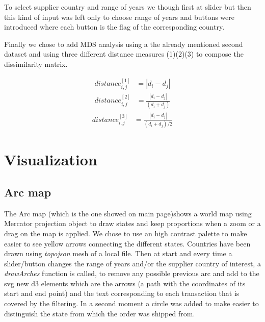 \documentclass{article}
\begin{document}
\begin{multicols}{2}
To select supplier country and range of years we though first at slider but then this kind of input was left only to choose range of years and buttons were introduced where each button is the flag of the corresponding country. 

Finally we chose to add MDS analysis using a the already mentioned second dataset and using three different distance measures (1)(2)(3) to compose the dissimilarity matrix.

\begin{align}
    distance_{i,j}^{[1]} &= | d_i-d_j | \label{eq:distance 1}
\end{align}
\begin{align}
    distance_{i,j}^{[2]} &= \frac{|d_i-d_j|}{(d_i+d_j)}\label{eq:distance 1}
\end{align}
\begin{align}
    distance_{i,j}^{[3]} &= \frac{|d_i-d_j|}{(d_i+d_j)/2} \label{eq:distance 1}
\end{align}


\section{Visualization}
\subsection{Arc map}
The Arc map (which is the one showed on main page)shows a world map using Mercator projection object to draw states and keep proportions when a zoom or a drag on the map is applied. We chose to use an high contrast palette to make easier to see yellow arrows connecting the different states. Countries have been drawn using \textit{topojson} mesh of a local file. Then at start and every time a slider/button changes the range of years and/or the supplier country of interest, a \textit{drawArches} function is called, to remove any possible previous arc and add to the svg new d3 elements which are the arrows (a path with the coordinates of its start and end point) and the text corresponding to each transaction that is covered by the filtering. In a second moment a circle was added to make easier to distinguish the state from which the order was shipped from.


\end{multicols}
\end{document}
